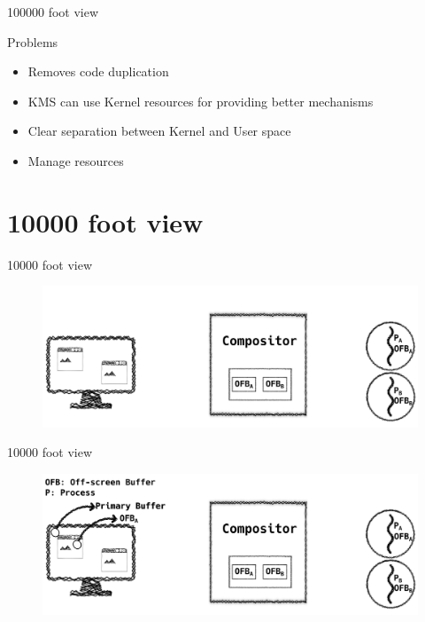 \documentclass[10pt, compress, aspectratio=169]{beamer}
\begin{document}
\begin{frame}{100000 foot view}
  \begin{exampleblock}{Problems}
    \begin{itemize}
      \item Removes code duplication \pause
      \item KMS can use Kernel resources for providing better mechanisms \pause
      \item Clear separation between Kernel and User space \pause
      \item Manage resources
    \end{itemize}
  \end{exampleblock}
\end{frame}

\section{10000 foot view}
\begin{frame}{10000 foot view}
  \begin{figure}
    \centering
    \includegraphics[width=\linewidth,
                     height=0.8\textheight,
                     keepaspectratio]{overview_graphics_drm_1-min}
  \end{figure}
\end{frame}

\begin{frame}{10000 foot view}
  \begin{figure}
    \centering
    \includegraphics[width=\linewidth,
                     height=0.8\textheight,
                     keepaspectratio]{overview_graphics_drm_2-min}
  \end{figure}
\end{frame}
\end{document}

